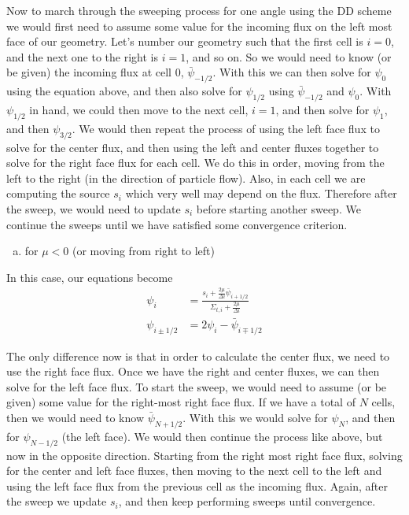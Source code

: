 \documentclass[10pt]{article}
\begin{document}
Now to march through the sweeping process for one angle using the DD scheme we would first need to assume some value for the incoming flux on the left most face of our geometry. Let's number our geometry such that the first cell is $i=0$, and the next one to the right is $i=1$, and so on. So we would need to know (or be given) the incoming flux at cell 0, $\bar{\psi}_{-1/2}$. With this we can then solve for $\psi_0$ using the equation above, and then also solve for $\psi_{1/2}$ using $\bar{\psi}_{-1/2}$ and $\psi_0$. With $\psi_{1/2}$ in hand, we could then move to the next cell, $i=1$, and then solve for $\psi_1$, and then $\psi_{3/2}$. We would then repeat the process of using the left face flux to solve for the center flux, and then using the left and center fluxes together to solve for the right face flux for each cell. We do this in order, moving from the left to the right (in the direction of particle flow). Also, in each cell we are computing the source $s_i$ which very well may depend on the flux. Therefore after the sweep, we would need to update $s_i$ before starting another sweep. We continue the sweeps until we have satisfied some convergence criterion.


\vspace{40pt}
\begin{enumerate}[(b)]
\item for $\mu < 0$ (or moving from right to left)
\end{enumerate}

In this case, our equations become
%
\begin{align*}
\psi_{i} &= \frac{s_{i} + \frac{2\mu}{\Delta i}\bar{\psi}_{i+1/2}}{\Sigma_{t,i} + \frac{2\mu}{\Delta i}} \\
\psi_{i\pm1/2} &= 2\psi_{i} - \bar{\psi}_{i\mp1/2}
\end{align*}

The only difference now is that in order to calculate the center flux, we need to use the right face flux. Once we have the right and center fluxes, we can then solve for the left face flux. To start the sweep, we would need to assume (or be given) some value for the right-most right face flux. If we have a total of $N$ cells, then we would need to know $\bar{\psi}_{N+1/2}$. With this we would solve for $\psi_N$, and then for $\psi_{N-1/2}$ (the left face). We would then continue the process like above, but now in the opposite direction. Starting from the right most right face flux, solving for the center and left face fluxes, then moving to the next cell to the left and using the left face flux from the previous cell as the incoming flux. Again, after the sweep we update $s_i$, and then keep performing sweeps until convergence.
\end{document}
